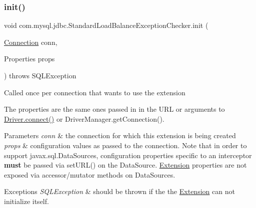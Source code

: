\mbox{\label{classcom_1_1mysql_1_1jdbc_1_1_standard_load_balance_exception_checker_ac8bb8f4e7d1e80c79687b68336eeae15}} 
\subsubsection{\texorpdfstring{init()}{init()}}
{\footnotesize\ttfamily void com.\+mysql.\+jdbc.\+Standard\+Load\+Balance\+Exception\+Checker.\+init (\begin{DoxyParamCaption}\item[{\mbox{\hyperlink{interfacecom_1_1mysql_1_1jdbc_1_1_connection}{Connection}}}]{conn,  }\item[{Properties}]{props }\end{DoxyParamCaption}) throws S\+Q\+L\+Exception}

Called once per connection that wants to use the extension

The properties are the same ones passed in in the U\+RL or arguments to \mbox{\hyperlink{classcom_1_1mysql_1_1jdbc_1_1_non_registering_driver_a834c012e752a01d1ee435b3461bb8218}{Driver.\+connect()}} or Driver\+Manager.\+get\+Connection().


\begin{DoxyParams}{Parameters}
{\em conn} & the connection for which this extension is being created \\
\hline
{\em props} & configuration values as passed to the connection. Note that in order to support javax.\+sql.\+Data\+Sources, configuration properties specific to an interceptor {\bfseries must} be passed via set\+U\+R\+L() on the Data\+Source. \mbox{\hyperlink{interfacecom_1_1mysql_1_1jdbc_1_1_extension}{Extension}} properties are not exposed via accessor/mutator methods on Data\+Sources.\\
\hline
\end{DoxyParams}

\begin{DoxyExceptions}{Exceptions}
{\em S\+Q\+L\+Exception} & should be thrown if the the \mbox{\hyperlink{interfacecom_1_1mysql_1_1jdbc_1_1_extension}{Extension}} can not initialize itself. \\
\hline
\end{DoxyExceptions}


